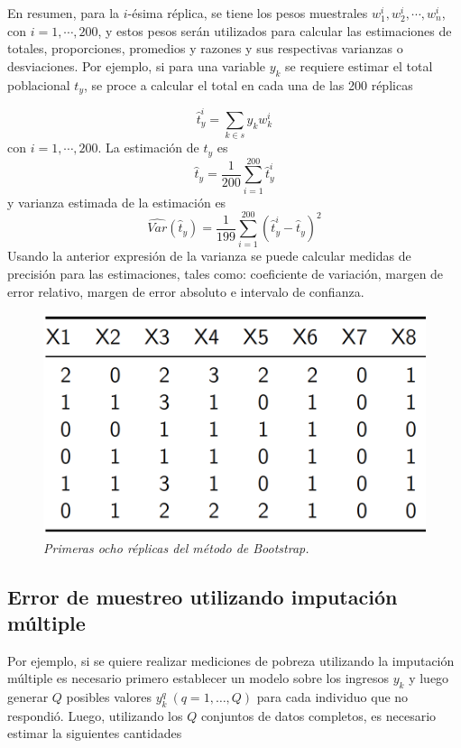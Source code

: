 En resumen, para la \(i\)-ésima réplica, se tiene los pesos muestrales \(w_1^i,w_2^i, \cdots, w_n^i\), con \(i=1,\cdots,200\), y estos pesos serán utilizados para calcular las estimaciones de totales, proporciones, promedios y razones y sus respectivas varianzas o desviaciones. Por ejemplo, si para una variable \(y_k\) se requiere estimar el total poblacional \(t_y\), se proce a calcular el total en cada una de las 200 réplicas

\[\hat{t}_y^i=\sum_{k\in s} y_kw_k^i\]
con \(i=1,\cdots,200\). La estimación de \(t_y\) es
\[\hat{t}_y=\frac{1}{200}\sum_{i=1}^{200}\hat{t}_y^i\]
y varianza estimada de la estimación es
\[\hat{Var}(\hat{t}_y)=\frac{1}{199}\sum_{i=1}^{200}(\hat{t}_y^i-\hat{t}_y)^2\]
Usando la anterior expresión de la varianza se puede calcular medidas de precisión para las estimaciones, tales como: coeficiente de variación, margen de error relativo, margen de error absoluto e intervalo de confianza.

\begin{figure}
\centering
\includegraphics{Pics/23.png}
\caption{\emph{Primeras ocho réplicas del método de Bootstrap.}}
\end{figure}

\hypertarget{error-de-muestreo-utilizando-imputacion-multiple}{%
\subsection*{Error de muestreo utilizando imputación múltiple}\label{error-de-muestreo-utilizando-imputacion-multiple}}


Por ejemplo, si se quiere realizar mediciones de pobreza utilizando la imputación múltiple es necesario primero establecer un modelo sobre los ingresos \(y_k\) y luego generar \(Q\) posibles valores \(y_k^q \ (q=1, \ldots, Q)\) para cada individuo que no respondió. Luego, utilizando los \(Q\) conjuntos de datos completos, es necesario estimar la siguientes cantidades

